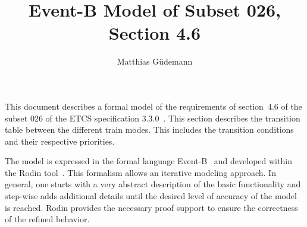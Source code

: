 \documentclass{template/openetcs_article}
\begin{document}
\frontmatter
{}





\newcommand{\true}{\ensuremath{true}}
\newcommand{\btext}[1]{{\it #1}}
\newcommand{\bvar}[1]{\btext{#1}}
\newcommand{\bevent}[1]{\btext{#1}}
\newcommand{\binv}[1]{\btext{#1}}
\newcommand{\bconst}[1]{\btext{#1}}
\newcommand{\bparam}[1]{\btext{#1}}
\newcommand{\bfunc}[1]{\btext{#1}}
\newcommand{\baxiom}[1]{\btext{#1}}
\newcommand{\btype}[1]{\btext{#1}}
\newcommand{\bguard}[1]{\btext{#1}}
\newcommand{\bmachine}[1]{\btext{#1}}
\newcommand{\bctx}[1]{\btext{#1}}

\author{Matthias Güdemann}


\title{Event-B Model of Subset 026, Section 4.6}




\maketitle
\tableofcontents
\listoffiguresandtables
\newpage

This document describes a formal model of the requirements of section~4.6 of the
subset 026 of the ETCS specification 3.3.0~\cite{ETCS}. This section describes
the transition table between the different train modes. This includes the
transition conditions and their respective priorities.

The model is expressed in the formal language Event-B~\cite{eventB} and
developed within the Rodin tool~\cite{rodin}. This formalism allows an iterative
modeling approach. In general, one starts with a very abstract description of
the basic functionality and step-wise adds additional details until the desired
level of accuracy of the model is reached. Rodin provides the necessary proof
support to ensure the correctness of the refined behavior.
\end{document}
